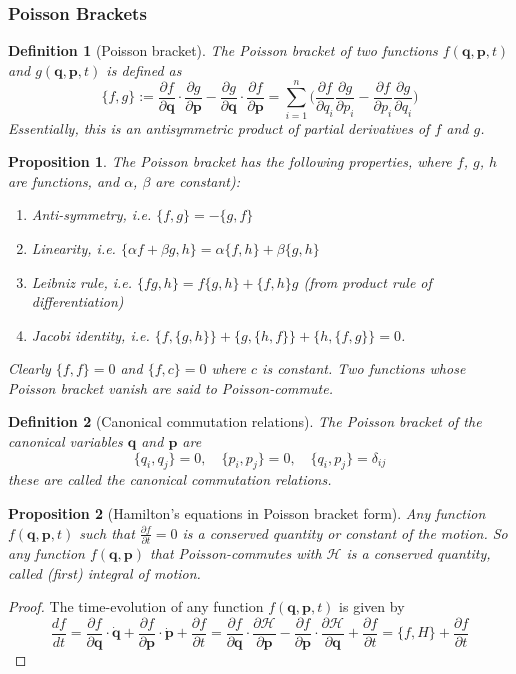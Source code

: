 \documentclass[a4paper]{article}
\theoremstyle{new}
\newtheorem{defi}{Definition}[section]
\newtheorem{prop}{Proposition}[section]
\begin{document}
\subsubsection{Poisson Brackets}
\begin{defi}[Poisson bracket]
The Poisson bracket of two functions $f(\mathbf{q}, \mathbf{p}, t)$ and $g(\mathbf{q}, \mathbf{p}, t)$ is defined as
$$\{f,g\}:=\frac{\partial f}{\partial\mathbf{q}}\cdot\frac{\partial g}{\partial\mathbf{p}}-\frac{\partial g}{\partial\mathbf{q}}\cdot\frac{\partial f}{\partial\mathbf{p}}=\sum_{i=1}^n\bigg(\frac{\partial f}{\partial q_i}\frac{\partial g}{\partial p_i}-\frac{\partial f}{\partial p_i}\frac{\partial g}{\partial q_i}\bigg)$$
Essentially, this is an antisymmetric product of partial derivatives of $f$ and $g$.
\end{defi}
\begin{prop}
The Poisson bracket has the following properties,  where  $f$, $g$, $h$ are functions, and $\alpha$, $\beta$ are constant):
\begin{enumerate}
    \item Anti-symmetry, i.e. $\{f,g\}=-\{g,f\}$
    \item Linearity, i.e. $\{\alpha f+\beta g,h\}=\alpha\{f,h\}+\beta\{g,h\}$
    \item Leibniz rule, i.e. $\{fg,h\}=f\{g,h\}+\{f,h\}g$ (from product rule of differentiation)
    \item Jacobi identity, i.e. $\{f,\{g,h\}\}+\{g,\{h,f\}\}+\{h,\{f,g\}\}=0$.
\end{enumerate}
Clearly $\{f, f\} = 0$ and $\{f, c\} = 0$ where $c$ is constant. Two functions whose Poisson bracket vanish are said to Poisson-commute.
\end{prop}
\begin{defi}[Canonical commutation relations]
The Poisson bracket of the canonical variables $\mathbf{q}$ and $\mathbf{p}$ are
$$\{q_i,q_j\}=0,\quad\{p_i,p_j\}=0,\quad\{q_i,p_j\}=\delta_{ij}$$
these are called the canonical commutation relations.  
\end{defi}
\begin{prop}[Hamilton's equations in Poisson bracket form]
Any function $f(\mathbf{q}, \mathbf{p}, t)$ such that $\frac{\partial f}{\partial t}=0$ is a conserved quantity or constant of the motion. So any function $f(\mathbf{q}, \mathbf{p})$ that Poisson-commutes with $\mathcal{H}$ is a conserved quantity, called (first) integral of motion. 
\end{prop}
\begin{proof}
The time-evolution of any function $f(\mathbf{q}, \mathbf{p}, t)$ is given by
$$\frac{df}{dt}=\frac{\partial f}{\partial\mathbf{q}}\cdot\mathbf{\dot{q}}+\frac{\partial f}{\partial\mathbf{p}}\cdot\mathbf{\dot{p}}+\frac{\partial f}{\partial t}=\frac{\partial f}{\partial\mathbf{q}}\cdot\frac{\partial\mathcal{H}}{\partial\mathbf{p}}-\frac{\partial f}{\partial\mathbf{p}}\cdot\frac{\partial\mathcal{H}}{\partial\mathbf{q}}+\frac{\partial f}{\partial t}=\{f,H\}+\frac{\partial f}{\partial t}$$
\end{proof}
\end{document}

